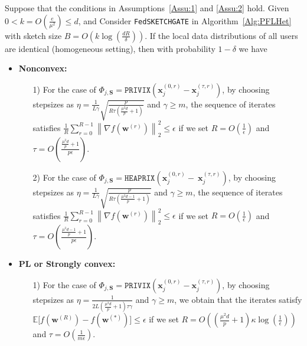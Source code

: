 \begin{theorem}\label{thm:hetreg_case}
  Suppose that the conditions in Assumptions~\ref{Assu:1} and \ref{Assu:2} hold. Given $0<k=O\left(\frac{e}{\mu^2}\right)\leq d$, and Consider \texttt{FedSKETCHGATE} in Algorithm~\ref{Alg:PFLHet} with sketch size $B=O\left(k\log\left(\frac{d R}{\delta}\right)\right)$. If the local data distributions of all users are identical (homogeneous setting), then with probability $1-\delta$ we have  
 \begin{itemize}
     \item \textbf{Nonconvex:}  
     \begin{itemize}
         \item [1)] For the case of $\Phi_{j,\mathbf{S}}=\texttt{PRIVIX}\left(\boldsymbol{x}_j^{(0,r)}-\boldsymbol{x}_j^{(\tau,r)}\right)$, by choosing stepsizes as $\eta=\frac{1}{L\gamma}\sqrt{\frac{p}{R\tau\left(\frac{\mu^2d}{p}+1\right)}}$ and $\gamma\geq m$, the sequence of iterates satisfies  $\frac{1}{R}\sum_{r=0}^{R-1}\left\|\nabla f({\boldsymbol{w}}^{(r)})\right\|_2^2\leq {\epsilon}$ if we set
     $R=O\left(\frac{1}{\epsilon}\right)$ and $ \tau=O\left(\frac{\frac{\mu^2d}{p}+1}{{p}\epsilon}\right)$.
         \item[2)] For the case of 
$  \Phi_{j,\mathbf{S}}=\texttt{HEAPRIX}\left(\boldsymbol{x}_j^{(0,r)}-~{\boldsymbol{x}}_{j}^{(\tau,r)}\right)$, by choosing stepsizes as $\eta=\frac{1}{L\gamma}\sqrt{\frac{p}{R\tau\left(\frac{\mu^2d-1}{p}+1\right)}}$ and $\gamma\geq m$, the sequence of iterates satisfies  $\frac{1}{R}\sum_{r=0}^{R-1}\left\|\nabla f({\boldsymbol{w}}^{(r)})\right\|_2^2\leq {\epsilon}$ if we set
     $R=O\left(\frac{1}{\epsilon}\right)$ and $ \tau=O\left(\frac{\frac{\mu^2d-1}{p}+1}{{p}\epsilon}\right)$. 
     \end{itemize}
     
     \item \textbf{PL or Strongly convex:}
      \begin{itemize}
          \item[1)] For the case of $\Phi_{j,\mathbf{S}}=\texttt{PRIVIX}\left(\boldsymbol{x}_j^{(0,r)}-\boldsymbol{x}_j^{(\tau,r)}\right)$, by choosing stepsizes as $\eta=\frac{1}{2L\left(\frac{\mu^2d}{p}+1\right)\tau\gamma}$ and $\gamma\geq m$, we obtain that the iterates satisfy $\mathbb{E}\Big[f({\boldsymbol{w}}^{(R)})-f({\boldsymbol{w}}^{(*)})\Big]\leq \epsilon$ if  we set
     $R=O\left(\left(\frac{\mu^2d}{p}+1\right)\kappa\log\left(\frac{1}{\epsilon}\right)\right)$ and $ \tau=O\left(\frac{1}{m\epsilon}\right)$.
          

\end{itemize}
\end{itemize}
\end{theorem}
